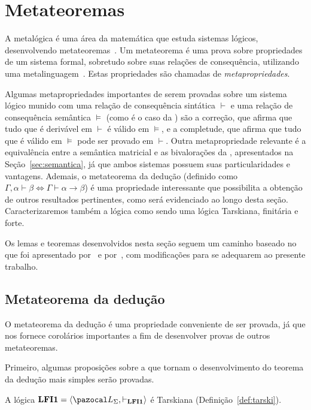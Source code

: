 \section{Metateoremas}\label{sec:metateoremas}
    A metalógica é uma área da matemática que estuda sistemas lógicos, desenvolvendo metateoremas~\cite{Jacquette2002-JACACT-7}. Um metateorema é uma prova sobre propriedades de um sistema formal, sobretudo sobre suas relações de consequência, utilizando uma metalinguagem~\cite{Tarski1956-TARLSM, Rasiowa1963-RASTMO, Barile_2024}. Estas propriedades são chamadas de \textit{metapropriedades}. 
    
    Algumas metapropriedades importantes de serem provadas sobre um sistema lógico munido com uma relação de consequência sintática $\vdash$ e uma relação de consequência semântica $\vDash$ (como é o caso da \lfium{}) são a correção, que afirma que tudo que é derivável em $\vdash$ é válido em $\vDash$, e a completude, que afirma que tudo que é válido em $\vDash$ pode ser provado em $\vdash$. Outra metapropriedade relevante é a equivalência entre a semântica matricial e as bivalorações da \lfium{}, apresentados na Seção~\ref{sec:semantica}, já que ambos sistemas possuem suas particularidades e vantagens. Ademais, o metateorema da dedução (definido como $\Gamma, \alpha \vdash \beta \Longleftrightarrow \Gamma \vdash \alpha \to \beta$) é uma propriedade interessante que possibilita a obtenção de outros resultados pertinentes, como será evidenciado ao longo desta seção. Caracterizaremos também a lógica \lfium{} como sendo uma lógica Tarskiana, finitária e \lfi{} forte.
    
    Os lemas e teoremas desenvolvidos nesta seção seguem um caminho baseado no que foi apresentado por~ e por~, com modificações para se adequarem ao presente trabalho.

    \subsection{Metateorema da dedução}\label{sec:mtd}
        O metateorema da dedução é uma propriedade conveniente de ser provada, já que nos fornece corolários importantes a fim de desenvolver provas de outros metateoremas.

        Primeiro, algumas proposições sobre a \lfium{} que tornam o desenvolvimento do teorema da dedução mais simples serão provadas.
        
        \begin{proposicao}\label{prop:tarski}        
            A lógica $\lfium{} = \langle \ling, \conhil \rangle$ é Tarskiana (Definição~\ref{def:tarski}).
        \end{proposicao}

